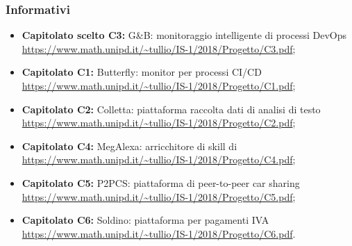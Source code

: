 		\subsubsection{Informativi}
		\begin{itemize}
			\item \textbf{Capitolato scelto C3:} G\&B: monitoraggio intelligente di processi DevOps \\ 
			\url{https://www.math.unipd.it/~tullio/IS-1/2018/Progetto/C3.pdf};
 			\item \textbf{Capitolato  C1:} Butterfly: monitor per processi CI/CD \\ \url{https://www.math.unipd.it/~tullio/IS-1/2018/Progetto/C1.pdf};
 			\item \textbf{Capitolato C2:} Colletta: piattaforma raccolta dati di analisi di testo \\ 
 			\url{https://www.math.unipd.it/~tullio/IS-1/2018/Progetto/C2.pdf};
 			\item \textbf{Capitolato C4:} MegAlexa: arricchitore di skill di  \\ \url{https://www.math.unipd.it/~tullio/IS-1/2018/Progetto/C4.pdf};
 			\item \textbf{Capitolato C5:} P2PCS: piattaforma di peer-to-peer car sharing \\ \url{https://www.math.unipd.it/~tullio/IS-1/2018/Progetto/C5.pdf};
 			\item \textbf{Capitolato C6:} Soldino: piattaforma  per pagamenti IVA \\ \url{https://www.math.unipd.it/~tullio/IS-1/2018/Progetto/C6.pdf}.
 			
		\end{itemize}
	\pagebreak
		


